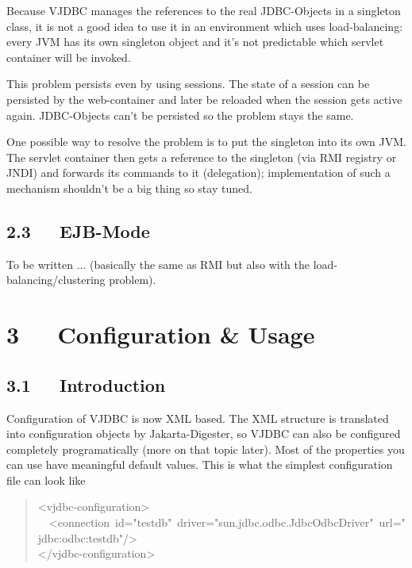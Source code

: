 \documentclass[10pt,a4paper,english]{article}
\begin{document}
Because VJDBC manages the references to the real JDBC-Objects in a singleton class, it is not a good idea to use it in an environment which uses load-balancing: every JVM has its own singleton object and it's not predictable which servlet container will be invoked.

This problem persists even by using sessions. The state of a session can be persisted by the web-container and later be reloaded when the session gets active again. JDBC-Objects can't be persisted so the problem stays the same.

One possible way to resolve the problem is to put the singleton into its own JVM. The servlet container then gets a reference to the singleton (via RMI registry or JNDI) and forwards its commands to it (delegation); implementation of such a mechanism shouldn't be a big thing so stay tuned.



\hypertarget{ejb-mode}{}
\subsection*{2.3~~~EJB-Mode}

To be written ... (basically the same as RMI but also with the load-balancing/clustering problem).



\hypertarget{configuration-usage}{}
\section*{3~~~Configuration {\&} Usage}



\hypertarget{id1}{}
\subsection*{3.1~~~Introduction}

Configuration of VJDBC is now XML based. The XML structure is translated into configuration objects by Jakarta-Digester, so VJDBC can also be configured completely programatically (more on that topic later). Most of the properties you can use have meaningful default values. This is what the simplest configuration file can look like
\begin{quote}{\ttfamily \raggedright \noindent
<vjdbc-configuration>~\\
~~<connection~id="testdb"~driver="sun.jdbc.odbc.JdbcOdbcDriver"~url="jdbc:odbc:testdb"/>~\\
</vjdbc-configuration>
}\end{quote}
\end{document}
